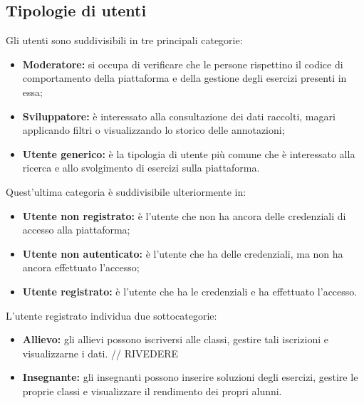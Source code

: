 \subsection{Tipologie di utenti}
Gli utenti sono suddivisibili in tre principali categorie: 
\begin{itemize}
	\item \textbf{Moderatore:} si occupa di verificare che le persone rispettino il codice di comportamento della piattaforma e della gestione degli esercizi presenti in essa;
	\item \textbf{Sviluppatore:} è interessato alla consultazione dei dati raccolti, magari applicando filtri o visualizzando lo storico delle annotazioni;
	\item \textbf{Utente generico:} è la tipologia di utente più comune che è interessato alla ricerca e allo svolgimento di esercizi sulla piattaforma.
\end{itemize}

Quest'ultima categoria è suddivisibile ulteriormente in:
\begin{itemize}
	\item \textbf{Utente non registrato:} è l'utente che non ha ancora delle credenziali di accesso alla piattaforma;
	\item \textbf{Utente non autenticato:} è l'utente che ha delle credenziali, ma non ha ancora effettuato l'accesso;
	\item \textbf{Utente registrato:} è l'utente che ha le credenziali e ha effettuato l'accesso.
\end{itemize}

L'utente registrato individua due sottocategorie:
\begin{itemize}
	\item \textbf{Allievo:} gli allievi possono iscriversi alle classi, gestire tali iscrizioni e visualizzarne i dati. // RIVEDERE
	\item \textbf{Insegnante:} gli insegnanti possono inserire soluzioni degli esercizi, gestire le proprie classi e visualizzare il rendimento dei propri alunni.
\end{itemize}